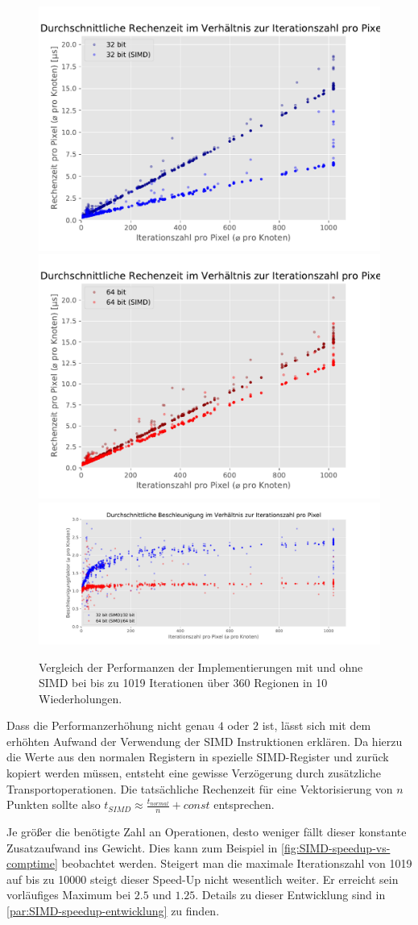 \begin{figure}
	\centering
	\includegraphics[width=0.45\linewidth]{img/Evaluation/simd/itvscmp32.pdf}
	\includegraphics[width=0.45\linewidth]{img/Evaluation/simd/itvscmp64.pdf}
	\includegraphics[width=\linewidth]{img/Evaluation/simd/speedup.pdf}
	\caption{Vergleich der Performanzen der Implementierungen mit und ohne SIMD bei bis zu 1019 Iterationen über 360 Regionen in 10 Wiederholungen.}
	\label{fig:SIMD-speedup}
	\label{fig:SIMD-speedup-vs-comptime}
\end{figure}

Dass die Performanzerhöhung nicht genau $4$ oder $2$ ist, lässt sich mit dem erhöhten Aufwand der Verwendung
der SIMD Instruktionen erklären.
Da hierzu die Werte aus den normalen Registern in spezielle SIMD-Register und zurück
kopiert werden müssen, entsteht eine gewisse Verzögerung durch zusätzliche Transportoperationen.
Die tatsächliche Rechenzeit für eine Vektorisierung von \(n\) Punkten sollte also \(t_{SIMD} \approx \frac{t_{normal}}{n}+ const\) entsprechen.

Je größer die benötigte Zahl an Operationen, desto weniger fällt dieser konstante Zusatzaufwand ins Gewicht.
Dies kann zum Beispiel in \autoref{fig:SIMD-speedup-vs-comptime} beobachtet werden.
Steigert man die maximale Iterationszahl von 1019 auf bis zu 10000 steigt dieser Speed-Up nicht wesentlich weiter.
Er erreicht sein vorläufiges Maximum bei $2.5$ und $1.25$. Details zu dieser Entwicklung sind in \autoref{par:SIMD-speedup-entwicklung} zu finden.

